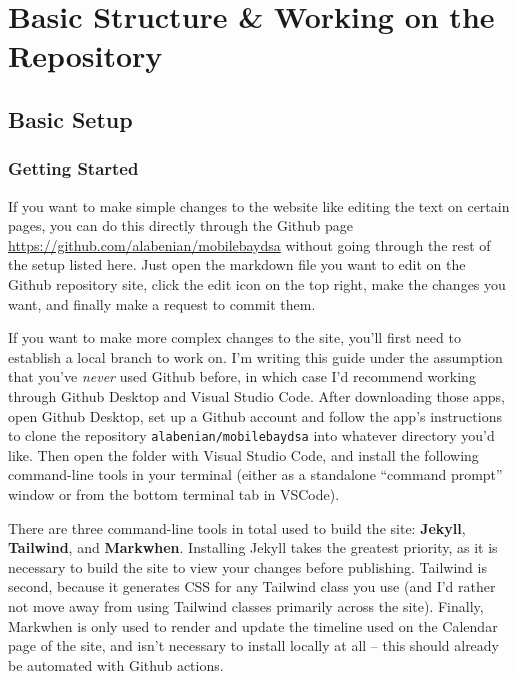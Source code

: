 \documentclass[
]{book}
\begin{document}
\part{Basic Structure \& Working on the Repository}\label{part-basic-structure-working-on-the-repository}

\chapter{Basic Setup}\label{basic-setup}

\section{Getting Started}\label{getting-started}

If you want to make simple changes to the website like editing the text on certain pages, you can do this directly through the Github page \url{https://github.com/alabenian/mobilebaydsa} without going through the rest of the setup listed here. Just open the markdown file you want to edit on the Github repository site, click the edit icon on the top right, make the changes you want, and finally make a request to commit them.

If you want to make more complex changes to the site, you'll first need to establish a local branch to work on. I'm writing this guide under the assumption that you've \emph{never} used Github before, in which case I'd recommend working through Github Desktop and Visual Studio Code. After downloading those apps, open Github Desktop, set up a Github account and follow the app's instructions to clone the repository \texttt{alabenian/mobilebaydsa} into whatever directory you'd like. Then open the folder with Visual Studio Code, and install the following command-line tools in your terminal (either as a standalone ``command prompt'' window or from the bottom terminal tab in VSCode).

There are three command-line tools in total used to build the site: \textbf{Jekyll}, \textbf{Tailwind}, and \textbf{Markwhen}. Installing Jekyll takes the greatest priority, as it is necessary to build the site to view your changes before publishing. Tailwind is second, because it generates CSS for any Tailwind class you use (and I'd rather not move away from using Tailwind classes primarily across the site). Finally, Markwhen is only used to render and update the timeline used on the Calendar page of the site, and isn't necessary to install locally at all -- this should already be automated with Github actions.
\end{document}
